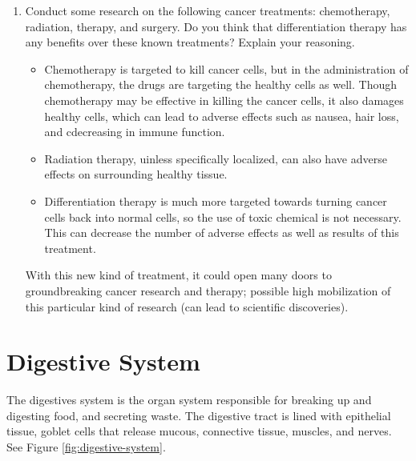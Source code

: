 \documentclass[12pt]{report}
\begin{document}
\begin{enumerate}
    \item{Conduct some research on the following cancer treatments: chemotherapy, radiation, therapy, and surgery. Do you think that differentiation therapy has any benefits over these known treatments? Explain your reasoning.}
        \begin{solution}
            \invis
            \begin{itemize}
                \item{Chemotherapy is targeted to kill cancer cells, but in the administration of chemotherapy, the drugs are targeting the healthy cells as well. Though chemotherapy may be effective in killing the cancer cells, it also damages healthy cells, which can lead to adverse effects such as nausea, hair loss, and cdecreasing in immune function.}
                \item{Radiation therapy, uinless specifically localized, can also have adverse effects on surrounding healthy tissue.}
                \item{Differentiation therapy is much more targeted towards turning cancer cells back into normal cells, so the use of toxic chemical is not necessary. This can decrease the number of adverse effects as well as results of this treatment.}
            \end{itemize}
            With this new kind of treatment, it could open many doors to groundbreaking cancer research and therapy; possible high mobilization of this particular kind of research (can lead to scientific discoveries).
        \end{solution}
\end{enumerate}

\section{Digestive System}
\begin{definition}
    The digestives system is the organ system responsible for breaking up and digesting food, and secreting waste. The digestive tract is lined with epithelial tissue, goblet cells that release mucous, connective tissue, muscles, and nerves. See Figure \ref{fig:digestive-system}.
\end{definition}
\end{document}
